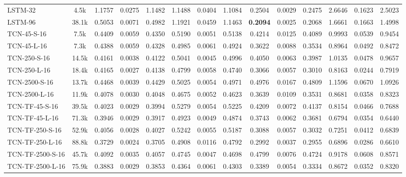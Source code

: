 \begin{table*}[h]
{\begin{tabular}{l c >{\columncolor{gray!20}}ccc >{\columncolor{gray!20}}ccc >{\columncolor{gray!20}}ccc >{\columncolor{gray!20}}ccc}
            \hline
            LSTM-32 & 4.5k & 1.1757 & 0.0275 & 1.1482 & 1.1488 & 0.0404 & 1.1084 & 0.2504 & 0.0029 & 0.2475 & 2.6646 & 0.1623 & 2.5023 \\ 
            LSTM-96 & 38.1k & 0.5053 & 0.0071 & 0.4982 & 1.1921 & 0.0459 & 1.1463 & \textbf{0.2094} & 0.0025 & 0.2068 & 1.6661 & 0.1663 & 1.4998 \\ 
            \hline
            TCN-45-S-16 & 7.5k & 0.4409 & 0.0059 & 0.4350 & 0.5190 & 0.0051 & 0.5138 & 0.4214 & 0.0125 & 0.4089 & 0.9993 & 0.0539 & 0.9454 \\ 
            TCN-45-L-16 & 7.3k & 0.4388 & 0.0059 & 0.4328 & 0.4985 & 0.0061 & 0.4924 & 0.3622 & 0.0088 & 0.3534 & 0.8964 & 0.0492 & 0.8472 \\
            TCN-250-S-16 & 14.5k & 0.4161 & 0.0038 & 0.4122 & 0.5041 & 0.0045 & 0.4996 & 0.4050 & 0.0063 & 0.3987 & 1.0135 & 0.0478 & 0.9657 \\ 
            TCN-250-L-16 & 18.4k & 0.4165 & 0.0027 & 0.4138 & 0.4799 & 0.0058 & 0.4740 & 0.3066 & 0.0057 & 0.3010 & 0.8163 & 0.0244 & 0.7919 \\
            TCN-2500-S-16 & 13.7k & 0.4468 & 0.0039 & 0.4429 & 0.5025 & 0.0054 & 0.4971 & 0.4976 & 0.0167 & 0.4809 & 1.1596 & 0.0670 & 1.0926 \\ 
            TCN-2500-L-16 & 11.9k & 0.4078 & 0.0030 & 0.4048 & 0.4675 & 0.0052 & 0.4623 & 0.3639 & 0.0109 & 0.3531 & 0.8681 & 0.0358 & 0.8323 \\
            \hline
            TCN-TF-45-S-16 & 39.5k & 0.4023 & 0.0029 & 0.3994 & 0.5279 & 0.0054 & 0.5225 & 0.4209 & 0.0072 & 0.4137 & 0.8154 & 0.0466 & 0.7688 \\
            TCN-TF-45-L-16 & 71.3k & 0.3946 & 0.0029 & 0.3917 & 0.4923 & 0.0049 & 0.4874 & 0.3743 & 0.0062 & 0.3681 & 0.6794 & 0.0354 & 0.6440 \\
            TCN-TF-250-S-16 & 52.9k & 0.4056 & 0.0028 & 0.4027 & 0.5242 & 0.0055 & 0.5187 & 0.3088 & 0.0057 & 0.3032 & 0.7251 & 0.0412 & 0.6839 \\
            TCN-TF-250-L-16 & 88.8k & 0.3729 & 0.0024 & 0.3705 & 0.4908 & 0.0116 & 0.4792 & 0.2992 & 0.0037 & 0.2955 & 0.6896 & 0.0286 & 0.6610 \\
            TCN-TF-2500-S-16 & 45.7k & 0.4092 & 0.0035 & 0.4057 & 0.4745 & 0.0047 & 0.4698 & 0.4799 & 0.0076 & 0.4724 & 0.9178 & 0.0608 & 0.8571 \\
            TCN-TF-2500-L-16 & 75.9k & 0.3883 & 0.0029 & 0.3853 & 0.4364 & 0.0061 & 0.4303 & 0.3389 & 0.0054 & 0.3334 & 0.8672 & 0.0352 & 0.8320 \\

\end{tabular}}
\end{table*}
